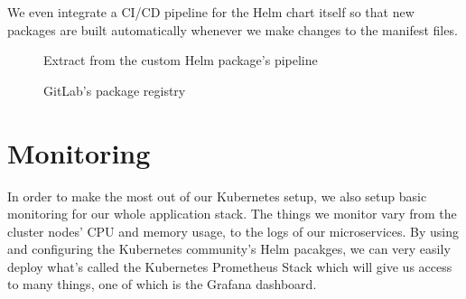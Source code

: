 We even integrate a CI/CD pipeline for the Helm chart itself so that new packages are built automatically whenever we make changes to the manifest files.

\begin{figure}[H]
    \centering
    \caption{Extract from the custom Helm package's pipeline}
    \label{fig:build-package-stage}
\end{figure}

\begin{figure}[H]
    \centering
    \caption{GitLab's package registry}
    \label{fig:gitlab-package-registry}
\end{figure}
\newpage

\section{Monitoring}
In order to make the most out of our Kubernetes setup, we also setup basic monitoring for our whole application stack.
The things we monitor vary from the cluster nodes' CPU and memory usage, to the logs of our microservices. By using and configuring the Kubernetes community's Helm pacakges, we can very easily deploy what's called the Kubernetes Prometheus Stack which will give us access to many things, one of which is the Grafana dashboard.

